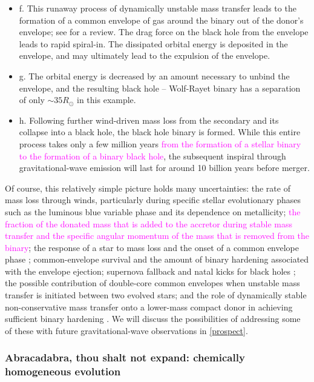 \documentclass[iop,onecolumn]{revtex4}
\newcommand{\ilya}[1]{\textcolor{magenta}{#1}}
\begin{document}
\begin{itemize}
\item{f.} This runaway process of dynamically unstable mass transfer leads to the formation of a common envelope of gas around the binary out of the donor's envelope; see \citet{Ivanova:2013} for a review.  The drag force on the black hole from the envelope leads to rapid spiral-in.   The dissipated orbital energy is deposited in the envelope, and may ultimately lead to the expulsion of the envelope.  
\item{g.} The orbital energy is decreased by an amount necessary to unbind the envelope, and the resulting black hole -- Wolf-Rayet binary has a separation of only $\sim 35 R_\odot$ in this example.  
\item{h.} Following further wind-driven mass loss from the secondary and its collapse into a black hole, the black hole binary is formed.  While this entire process takes only a few million years \ilya{from the formation of a stellar binary to the formation of a binary black hole}, the subsequent inspiral through gravitational-wave emission will last for around 10 billion years before merger.
\end{itemize}

Of course, this relatively simple picture holds many uncertainties: the rate of mass loss through winds, particularly during specific stellar evolutionary phases such as the luminous blue variable phase \citep{Mennekens:2014} and its dependence on metallicity; \ilya{the fraction of the donated mass that is added to the accretor during stable mass transfer and the specific angular momentum of the mass that is removed from the binary}; the response of a star to mass loss and the onset of a common envelope phase \citep{Pavlovskii:2017}; common-envelope survival and the amount of binary hardening associated with the envelope ejection; supernova fallback and natal kicks for black holes \citep[e.g.,][]{Repetto:2012,Mandel:2015kicks}; the possible contribution of double-core common envelopes when unstable mass transfer is initiated between two evolved stars; and the role of dynamically stable non-conservative mass transfer onto a lower-mass compact donor in achieving sufficient binary hardening  \citep{vandenHeuvel:2017,Neijssel:2018}.  We will discuss the possibilities of addressing some of these with future gravitational-wave observations in \autoref{prospect}.

\subsubsection{Abracadabra, thou shalt not expand: chemically homogeneous evolution}
\end{document}
